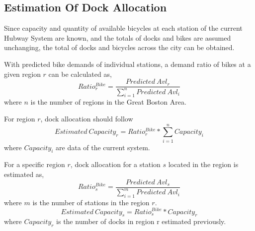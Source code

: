 \documentclass[journal, letterpaper]{IEEEtran}
\begin{document}
\subsection{Estimation Of Dock Allocation}
Since capacity and quantity of available bicycles at each station of the current Hubway System are known, and the totals of docks and bikes are assumed unchanging, the total of docks and bicycles across the city can be obtained. 

With predicted bike demands of individual stations, a demand ratio of bikes at a given region $r$ can be calculated as, 
$$Ratio_{r}^{Bike} = \frac{Predicted \ Avl_{r}}{\sum_{i=1}^{n}Predicted \ Avl_{i}}$$
where $n$ is the number of regions in the Great Boston Area.

For region $r$, dock allocation should follow
$$Estimated \ Capacity_{r} = Ratio_{r}^{Bike} * \sum_{i=1}^{n}Capacity_{i}$$
where $Capacity_{i}$ are data of the current system.

For a specific region $r$, dock allocation for a station $s$ located in the region is estimated as,
$$Ratio_{s}^{Bike} = \frac{Predicted \ Avl_{s}}{\sum_{i=1}^{m}Predicted \ Avl_{i}}$$
where $m$ is the number of stations in the region $r$.
$$Estimated \ Capacity_{s} = Ratio_{s}^{Bike} * Capacity_{r}$$
where $Capacity_{r}$ is the number of docks in region r estimated previously. 

\end{document}
